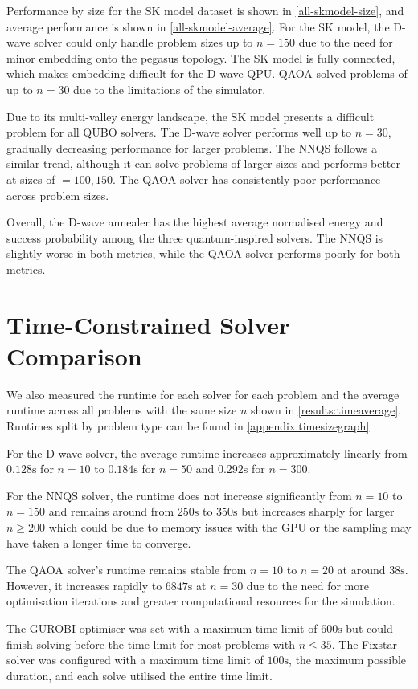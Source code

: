 Performance by size for the SK model dataset is shown in \autoref{all-skmodel-size}, and average performance is shown in \autoref{all-skmodel-average}. For the SK model, the D-wave solver could only handle problem sizes up to $n=150$ due to the need for minor embedding onto the pegasus topology. The SK model is fully connected, which makes embedding difficult for the D-wave QPU. QAOA solved problems of up to $n=30$ due to the limitations of the simulator.

Due to its multi-valley energy landscape, the SK model presents a difficult problem for all QUBO solvers. The D-wave solver performs well up to $n=30$, gradually decreasing performance for larger problems. The NNQS follows a similar trend, although it can solve problems of larger sizes and performs better at sizes of $=100,150$. The QAOA solver has consistently poor performance across problem sizes.

Overall, the D-wave annealer has the highest average normalised energy and success probability among the three quantum-inspired solvers. The NNQS is slightly worse in both metrics, while the QAOA solver performs poorly for both metrics.

\section{Time-Constrained Solver Comparison}
We also measured the runtime for each solver for each problem and the average runtime across all problems with the same size $n$ shown in \autoref{results:timeaverage}. Runtimes split by problem type can be found in \autoref{appendix:timesizegraph}

For the D-wave solver, the average runtime increases approximately linearly from $0.128\si{\second}$ for $n=10$ to $0.184\si{\second}$ for $n=50$ and $0.292\si{\second}$ for $n=300$. 

For the NNQS solver, the runtime does not increase significantly from $n=10$ to $n=150$ and remains around from $250\si{\second}$ to $350\si{\second}$ but increases sharply for larger $n \geq 200$ which could be due to memory issues with the GPU or the sampling may have taken a longer time to converge. 

The QAOA solver's runtime remains stable from $n=10$ to $n=20$ at around $38 \si{\second}$. However, it increases rapidly to $6847 \si{\second}$ at $n=30$ due to the need for more optimisation iterations and greater computational resources for the simulation.

The GUROBI optimiser was set with a maximum time limit of $600 \si{\second}$ but could finish solving before the time limit for most problems with $n \leq 35$. The Fixstar solver was configured with a maximum time limit of $100 \si{\second}$, the maximum possible duration, and each solve utilised the entire time limit.

